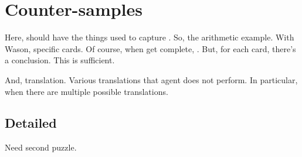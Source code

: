 \chapter{Counter-samples}
\label{cha:ces}




\begin{note}
  Here, should have the things used to capture \tCV{}.
  So, the arithmetic example.
  With Wason, specific cards.
  Of course, when get complete, \wit{}.
  But, for each card, there's a conclusion.
  This is sufficient.

  And, translation.
  Various translations that agent does not perform.
  In particular, when there are multiple possible translations.
\end{note}

\section{Detailed }

{
  \color{red}
  Need second puzzle.
}

